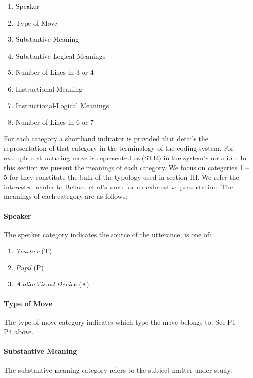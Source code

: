 \documentclass[conference]{IEEEtran}
\begin{document}
\begin{enumerate}
  \item Speaker
  \item Type of Move
  \item Substantive Meaning
  \item Substantive-Logical Meanings
  \item Number of Lines in 3 or 4
  \item Instructional Meaning
  \item Instructional-Logical Meanings
  \item Number of Lines in 6 or 7
\end{enumerate}

For each category a shorthand indicator is provided that details the
representation of that category in the terminology of the coding system.
For example a structuring move is represented as (STR) in the system's
notation. In this section we present the meanings of each category. We focus on
categories 1 -- 5 for they constitute the bulk of the typology used in section
III. We refer the interested reader to Bellack et al's work for an
exhaustive presentation \cite{bellack1966language}.The meanings of each category are as follows:

\paragraph{Speaker}
The speaker category indicates the source of the utterance, is one of:
  \begin{enumerate}
    \item \emph{Teacher} (T)
    \item \emph{Pupil} (P)
    \item \emph{Audio-Visual Device} (A)
  \end{enumerate}
\paragraph{Type of Move}
The type of move category indicates which type the move
belongs to. See P1 -- P4 above.

\paragraph{Substantive Meaning}
The substantive meaning category refers to
the subject matter under study.
\end{document}
